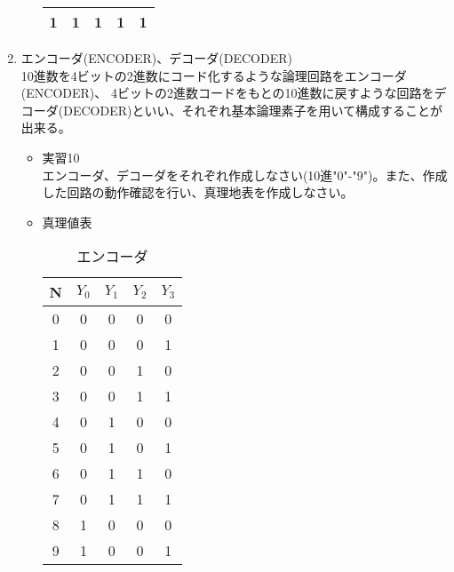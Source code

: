 \documentclass[dvipdfmx]{jsarticle}
\begin{document}
\begin{enumerate}
\begin{itemize}
\begin{table}[H]
\begin{tabular}{|c|c|c|c|c|}
											1 & 1 & 1 & 1 & 1\\ \hline
										\end{tabular}
									\end{table}
							\end{itemize}
						\item エンコーダ(ENCODER)、デコーダ(DECODER) \\
							10進数を4ビットの2進数にコード化するような論理回路をエンコーダ(ENCODER)、
							4ビットの2進数コードをもとの10進数に戻すような回路をデコーダ(DECODER)といい、それぞれ基本論理素子を用いて構成することが出来る。
							\begin{itemize}
								\item 実習10 \\
									エンコーダ、デコーダをそれぞれ作成しなさい(10進"0"-"9")。また、作成した回路の動作確認を行い、真理地表を作成しなさい。
								\item 真理値表
									\begin{table}[H]
									\center
									\caption{エンコーダ\label{tb:encoder}}
									\begin{tabular}{|c|c|c|c|c|}
										\hline
										N & $Y_0$ & $Y_1$ & $Y_2$ &$Y_3$ \\ \hline
										0 & 0 & 0 & 0 & 0 \\ \hline
										1 & 0 & 0 & 0 & 1\\ \hline
										2 & 0 & 0 & 1 & 0\\ \hline
										3 & 0 & 0 & 1 & 1\\ \hline
										4 & 0 & 1 & 0 & 0 \\ \hline
										5 & 0 & 1 & 0 & 1\\ \hline
										6 & 0 & 1 & 1 & 0\\ \hline
										7 & 0 & 1 & 1 & 1\\ \hline
										8 & 1 & 0 & 0 & 0\\ \hline
										9 & 1 & 0 & 0 & 1\\ \hline
									\end{tabular}
								\end{table}								
						\end{itemize}
					\end{enumerate}
\end{document}
